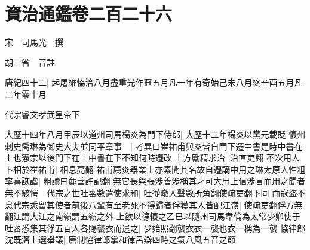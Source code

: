 \chapter{資治通鑑卷二百二十六}
宋　司馬光　撰

胡三省　音註

唐紀四十二|{
	起屠維恊洽八月盡重光作噩五月凡一年有奇始己未八月終辛酉五月凡二年零十月}


代宗睿文孝武皇帝下

大歷十四年八月甲辰以道州司馬楊炎為門下侍郎|{
	大歷十二年楊炎以黨元載貶}
懷州刺史喬琳為御史大夫並同平章事　|{
	考異曰崔祐甫與炎皆自門下遷中書是時中書在上也憲宗以後門下在上中書在下不知何時遷改}
上方勵精求治|{
	治直吏翻}
不次用人卜相於崔祐甫|{
	相息亮翻}
祐甫薦炎器業上亦素聞其名故自遷謫中用之琳太原人性粗率喜詼諧|{
	粗讀曰麁善許記翻}
無它長與張涉善涉稱其才可大用上信涉言而用之聞者無不駭愕　代宗之世吐蕃數遣使求和|{
	吐從暾入聲數所角翻使疏吏翻下同}
而寇盜不息代宗悉留其使者前後八輩有至老死不得歸者俘獲其人皆配江嶺|{
	使疏吏翻俘方無翻江謂大江之南嶺謂五嶺之外}
上欲以德懷之乙巳以隨州司馬韋倫為太常少卿使于吐蕃悉集其俘五百人各賜襲衣而遣之|{
	少始照翻襲衣衣一襲也衣一稱為一襲}
恊律郎沈既濟上選舉議|{
	唐制恊律郎掌和律呂辯四時之氣八風五音之節}


